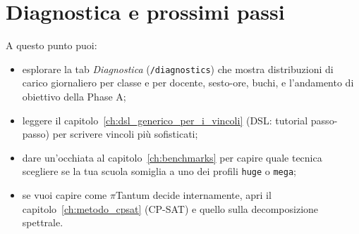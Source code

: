 \section{Diagnostica e prossimi passi}

A questo punto puoi:

\begin{itemize}
\item esplorare la tab \emph{Diagnostica}
  (\texttt{/diagnostics}) che mostra distribuzioni di carico
  giornaliero per classe e per docente, sesto-ore, buchi,
  e l'andamento di obiettivo della Phase A;
\item leggere il capitolo~\ref{ch:dsl_generico_per_i_vincoli}
  (DSL: tutorial passo-passo) per scrivere vincoli pi\`u
  sofisticati;
\item dare un'occhiata al capitolo~\ref{ch:benchmarks} per
  capire quale tecnica scegliere se la tua scuola somiglia a
  uno dei profili \texttt{huge} o \texttt{mega};
\item se vuoi capire come $\pi$Tantum decide internamente,
  apri il capitolo~\ref{ch:metodo_cpsat} (CP-SAT) e quello
  sulla decomposizione spettrale.
\end{itemize}

\fleuron


